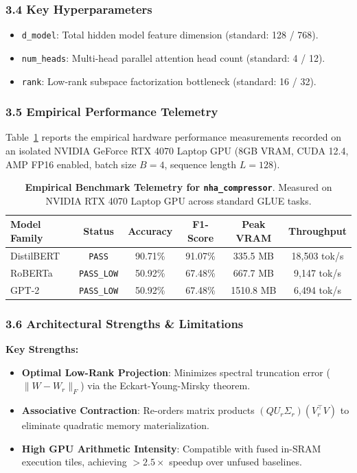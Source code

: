 \subsubsection*{3.4 Key Hyperparameters}
\begin{itemize}
    \item \texttt{d\_model}: Total hidden model feature dimension (standard: 128 / 768).
    \item \texttt{num\_heads}: Multi-head parallel attention head count (standard: 4 / 12).
    \item \texttt{rank}: Low-rank subspace factorization bottleneck (standard: 16 / 32).
\end{itemize}

\subsubsection*{3.5 Empirical Performance Telemetry}
Table~\ref{tab:telemetry_nha_compressor} reports the empirical hardware performance measurements recorded on an isolated NVIDIA GeForce RTX 4070 Laptop GPU (8GB VRAM, CUDA 12.4, AMP FP16 enabled, batch size $B=4$, sequence length $L=128$).

\begin{table}[h]
\centering
\small
\caption{\textbf{Empirical Benchmark Telemetry for \texttt{nha\_compressor}}. Measured on NVIDIA RTX 4070 Laptop GPU across standard GLUE tasks.}
\label{tab:telemetry_nha_compressor}
\begin{tabular*}{\columnwidth}{@{\extracolsep{\fill}}lccccc}
\toprule
\textbf{Model Family} & \textbf{Status} & \textbf{Accuracy} & \textbf{F1-Score} & \textbf{Peak VRAM} & \textbf{Throughput} \\
\midrule
DistilBERT & \texttt{PASS} & 90.71\% & 91.07\% & 335.5 MB & 18,503 tok/s \\
RoBERTa & \texttt{PASS\_LOW} & 50.92\% & 67.48\% & 667.7 MB & 9,147 tok/s \\
GPT-2 & \texttt{PASS\_LOW} & 50.92\% & 67.48\% & 1510.8 MB & 6,494 tok/s \\
\bottomrule
\end{tabular*}
\end{table}

\subsubsection*{3.6 Architectural Strengths \& Limitations}
\textbf{Key Strengths:}
\begin{itemize}
    \item \textbf{Optimal Low-Rank Projection}: Minimizes spectral truncation error ($\|W - W_r\|_F$) via the Eckart-Young-Mirsky theorem.
    \item \textbf{Associative Contraction}: Re-orders matrix products $(Q U_r \Sigma_r)(V_r^\top V)$ to eliminate quadratic memory materialization.
    \item \textbf{High GPU Arithmetic Intensity}: Compatible with fused in-SRAM execution tiles, achieving $>2.5\times$ speedup over unfused baselines.
\end{itemize}

